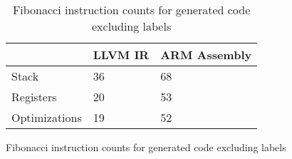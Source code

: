 \begin{table}[h!]
\centering
\begin{tabular}{p{}p{}p{}}
  \hline
 & LLVM IR & ARM Assembly \\ 
  \hline
Stack &  36 &  68 \\ 
  Registers &  20 &  53 \\ 
  Optimizations &  19 &  52 \\ 
   \hline
\end{tabular}
\caption{Fibonacci instruction counts for generated code excluding labels}
\caption{Fibonacci instruction counts for generated code excluding labels}
\end{table}
